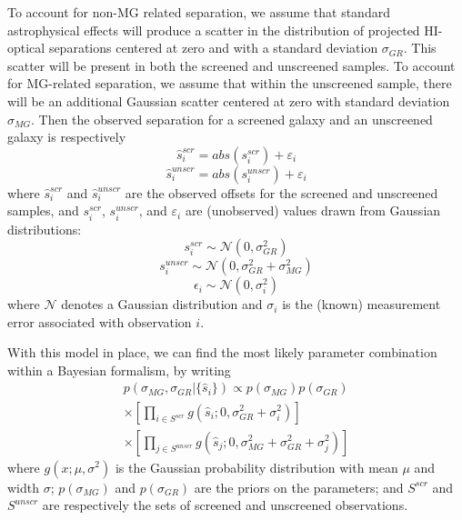 \documentclass[twocolappendix, numberedappendix]{emulateapj}
\begin{document}
To account for non-MG related separation, we assume that standard
astrophysical effects will produce a
scatter in the distribution of projected HI-optical separations centered
at zero and with a standard deviation $\sigma_{GR}$.  This scatter will
be present in both the screened and unscreened samples.
To account for MG-related separation, we
assume that within the unscreened sample, there will be an additional
Gaussian scatter centered at zero with standard deviation $\sigma_{MG}$.
Then the observed separation for a screened galaxy and an unscreened galaxy
is respectively
\begin{equation}
  \hat{s}^{scr}_i = abs(s^{scr}_i) + \varepsilon_i \nonumber
\end{equation}
\begin{equation}
  \hat{s}^{unscr}_i = abs(s^{unscr}_i) + \varepsilon_i
\end{equation}
where $\hat{s}^{scr}_i$ and $\hat{s}^{unscr}_i$ are the observed offsets
for the screened and unscreened samples, and
 $s^{scr}_i$, $s^{unscr}_i$, and $\varepsilon_i$ are (unobserved) values
drawn from Gaussian distributions:
\begin{equation}
  s^{scr}_i \sim \mathcal{N}(0, \sigma_{GR}^2) \nonumber
\end{equation}
\begin{equation}
  s^{unscr}_i \sim \mathcal{N}(0, \sigma_{GR}^2 + \sigma_{MG}^2) \nonumber
\end{equation}
\begin{equation}
  \epsilon_i \sim \mathcal{N}(0, \sigma_i^2)
\end{equation}
where  $\mathcal{N}$ denotes a Gaussian distribution and $\sigma_i$ is the
(known)
measurement error associated with observation $i$.

With this model in place, we can find the most likely parameter combination
within a Bayesian formalism, by writing
\begin{equation}
\begin{split}
  \label{eq:separation_likelihood}
  p(\sigma_{MG}, \sigma_{GR}|\{\hat{s}_i\})
  \propto
  p(\sigma_{MG})p(\sigma_{GR}) \\
  \times \left[ \prod_{i \in S^{scr}} g(\hat{s}_i;0, \sigma_{GR}^2 +
\sigma_i^2)\right]\\
\times
  \left[ \prod_{j \in S^{unscr}} g(\hat{s}_j;0, \sigma_{MG}^2 +
\sigma_{GR}^2 + \sigma_j^2)\right]
\end{split}
\end{equation}
where $g(x;\mu,\sigma^2)$ is the Gaussian probability distribution with
mean $\mu$ and width $\sigma$; $p(\sigma_{MG})$ and $p(\sigma_{GR})$ are the
priors on the parameters; and $S^{scr}$ and $S^{unscr}$ are respectively the
sets of screened and unscreened observations.
\end{document}
